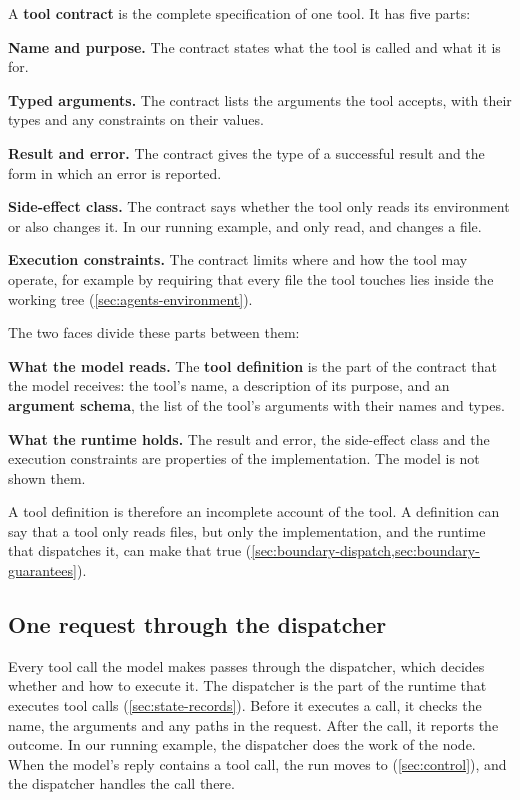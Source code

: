 A \textbf{tool contract} is the complete specification of one tool. It has five parts:
\bi
\item \textbf{Name and purpose.} The contract states what the tool is called and what it is for.
\item \textbf{Typed arguments.} The contract lists the arguments the tool accepts, with their types
and any constraints on their values.
\item \textbf{Result and error.} The contract gives the type of a successful result and the form in
which an error is reported.
\item \textbf{Side-effect class.} The contract says whether the tool only reads its environment or
also changes it. In our running example,  and  only read, and
 changes a file.
\item \textbf{Execution constraints.} The contract limits where and how the tool may operate, for
example by requiring that every file the tool touches lies inside the working tree
(\cref{sec:agents-environment}).
\ei

The two faces divide these parts between them:
\bi
\item \textbf{What the model reads.} The \textbf{tool definition} is the part of the contract that
the model receives: the tool's name, a description of its purpose, and an \textbf{argument schema},
the list of the tool's arguments with their names and types.
\item \textbf{What the runtime holds.} The result and error, the side-effect class and the execution
constraints are properties of the implementation. The model is not shown them.
\ei

A tool definition is therefore an incomplete account of the tool. A definition can say that a tool
only reads files, but only the implementation, and the runtime that dispatches it, can make that true
(\cref{sec:boundary-dispatch,sec:boundary-guarantees}).

\subsection{One request through the dispatcher}
\label{sec:boundary-dispatch}

Every tool call the model makes passes through the dispatcher, which decides whether and how to
execute it. The dispatcher is the part of the runtime that executes tool calls (\cref{sec:state-records}).
Before it executes a call, it checks the name, the arguments and any paths in the request. After the
call, it reports the outcome. In our running example, the dispatcher does the work of the
 node. When the model's reply contains a tool call, the run moves to 
(\cref{sec:control}), and the dispatcher handles the call there.

